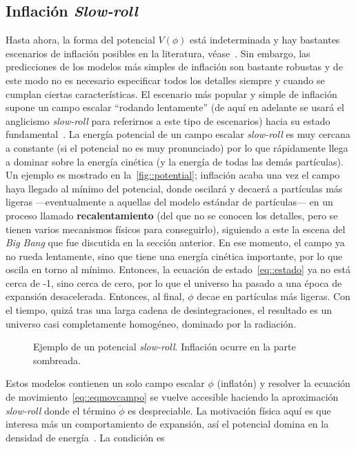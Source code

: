 \subsection{Inflación \textit{Slow-roll}}
Hasta ahora, la forma del potencial \(V(\phi)\) está indeterminada y hay bastantes escenarios de inflación posibles en la literatura, véase~\cite{liddle2000cosmological}. Sin embargo, las predicciones de los modelos más simples de inflación son bastante robustas y de este modo no es necesario especificar todos los detalles siempre y cuando se cumplan ciertas características. El escenario más popular y simple de inflación supone un campo escalar ``rodando lentamente'' (de aquí en adelante se usará el anglicismo \textit{slow-roll} para referirnos a este tipo de escenarios) hacia su estado fundamental~\cite{linde1982new,albrecht1982cosmology}. La energía potencial de un campo escalar \textit{slow-roll} es muy cercana a constante (si el potencial no es muy pronunciado) por lo que rápidamente llega a dominar sobre la energía cinética (y la energía de todas las demás partículas). Un ejemplo es mostrado en la~\autoref{fig::potential}; inflación acaba una vez el campo haya llegado al mínimo del potencial, donde oscilará y decaerá a partículas más ligeras ---eventualmente a aquellas del modelo estándar de partículas--- en un proceso llamado \textbf{recalentamiento} (del que no se conocen los detalles, pero se tienen varios mecanismos físicos para conseguirlo), siguiendo a este la escena del \textit{Big Bang} que fue discutida en la sección anterior. En ese momento, el campo ya no rueda lentamente, sino que tiene una energía cinética importante, por lo que oscila en torno al mínimo. Entonces, la ecuación de estado~\ref{eq::estado} ya no está cerca de -1, sino cerca de cero, por lo que el universo ha pasado a una época de expansión desacelerada. Entonces, al final, \(\phi\) decae en partículas más ligeras. Con el tiempo, quizá tras una larga cadena de desintegraciones, el resultado es un universo casi completamente homogéneo, dominado por la radiación.
\begin{figure}[t]
    \centering
    \def\svgwidth{0.65\textwidth}
    
    \caption[Ejemplo de un potencial \textit{slow-roll}]{Ejemplo de un potencial \textit{slow-roll}. Inflación ocurre en la parte sombreada.}
    \label{fig::potential}
\end{figure}
\newpage
Estos modelos contienen un solo campo escalar \(\phi\) (inflatón) y resolver la ecuación de movimiento~\ref{eq::eqmovcampo} se vuelve accesible haciendo la aproximación \textit{slow-roll} donde el término \(\ddot{\phi}\) es despreciable. La motivación física aquí es que interesa más un comportamiento de expansión, así el potencial domina en la densidad de energía~\cite{peacock1998cosmological}. La condición es
